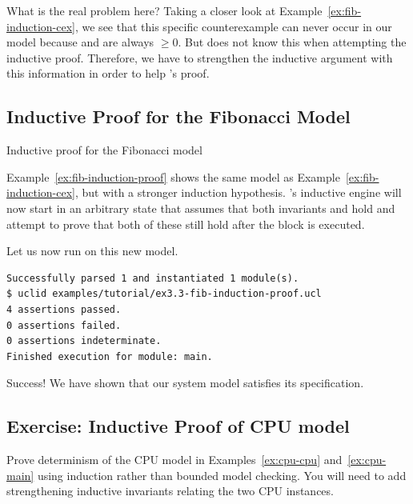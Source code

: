 What is the real problem here? Taking a closer look at Example~\ref{ex:fib-induction-cex}, we see that this specific counterexample can never occur in our model because  and  are always $\ge 0$. But \uclid{} does not know this when attempting the inductive proof. Therefore, we have to strengthen the inductive argument with this information in order to help \uclid{}'s proof.

\subsection{Inductive Proof for the Fibonacci Model}

\begin{uclidlisting}[htbp]
    
    \caption{Inductive proof for the Fibonacci model}
    \label{ex:fib-induction-proof}
\end{uclidlisting}

Example~\ref{ex:fib-induction-proof} shows the same model as Example~\ref{ex:fib-induction-cex}, but with a stronger induction hypothesis. \uclid{}'s inductive engine will now start in an arbitrary state that assumes that both invariants  and  hold and attempt to prove that both of these still hold after the  block is executed.

Let us now run \uclid{} on this new model.

\begin{Verbatim}[frame=single, samepage=true]
Successfully parsed 1 and instantiated 1 module(s).
$ uclid examples/tutorial/ex3.3-fib-induction-proof.ucl 
4 assertions passed.
0 assertions failed.
0 assertions indeterminate.
Finished execution for module: main.
\end{Verbatim}

Success! We have shown that our system model satisfies its specification.

\subsection{Exercise: Inductive Proof of CPU model}
Prove determinism of the CPU model in Examples~\ref{ex:cpu-cpu} 
and~\ref{ex:cpu-main} using induction rather than bounded model 
checking. You will need to add strengthening inductive invariants relating the two CPU instances.

